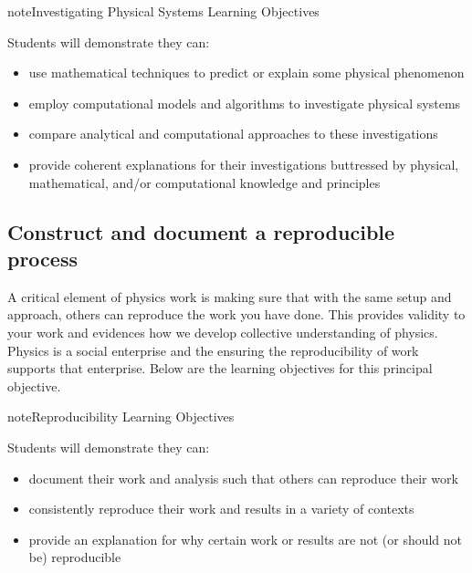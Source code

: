 \documentclass[letterpaper,10pt,english]{jupyterBook}
\begin{document}
\begin{sphinxadmonition}{note}{Investigating Physical Systems Learning Objectives}

\sphinxAtStartPar
Students will demonstrate they can:
\begin{itemize}
\item {} 
\sphinxAtStartPar
use mathematical techniques to predict or explain some physical phenomenon

\item {} 
\sphinxAtStartPar
employ computational models and algorithms to investigate physical systems

\item {} 
\sphinxAtStartPar
compare analytical and computational approaches to these investigations

\item {} 
\sphinxAtStartPar
provide coherent explanations for their investigations buttressed by physical, mathematical, and/or computational knowledge and principles

\end{itemize}
\end{sphinxadmonition}


\subsection{Construct and document a reproducible process}
\label{\detokenize{content/0_course/1_goals:construct-and-document-a-reproducible-process}}
\sphinxAtStartPar
A critical element of physics work is making sure that with the same setup and approach, others can reproduce the work you have done. This provides validity to your work and evidences how we develop collective understanding of physics. Physics is a social enterprise and the ensuring the reproducibility of work supports that enterprise. Below are the learning objectives for this principal objective.

\begin{sphinxadmonition}{note}{Reproducibility Learning Objectives}

\sphinxAtStartPar
Students will demonstrate they can:
\begin{itemize}
\item {} 
\sphinxAtStartPar
document their work and analysis such that others can reproduce their work

\item {} 
\sphinxAtStartPar
consistently reproduce their work and results in a variety of contexts

\item {} 
\sphinxAtStartPar
provide an explanation for why certain work or results are not (or should not be) reproducible

\end{itemize}
\end{sphinxadmonition}
\end{document}
